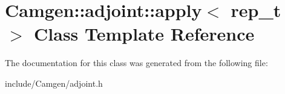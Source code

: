 \hypertarget{a00011}{\section{Camgen\-:\-:adjoint\-:\-:apply$<$ rep\-\_\-t $>$ Class Template Reference}
\label{a00011}
}


The documentation for this class was generated from the following file\-:\begin{DoxyCompactItemize}
\item 
include/\-Camgen/adjoint.\-h\end{DoxyCompactItemize}
